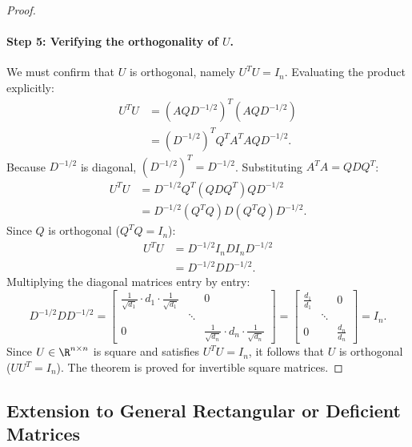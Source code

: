 \begin{proof}
\paragraph{Step 5: Verifying the orthogonality of $U$.}
We must confirm that $U$ is orthogonal, namely $U^T U = I_n$.
Evaluating the product explicitly:
\begin{align}
    U^T U &= \left( A Q D^{-1/2} \right)^T \left( A Q D^{-1/2} \right) \nonumber \\
          &= \left( D^{-1/2} \right)^T Q^T A^T A Q D^{-1/2}.
\end{align}
Because $D^{-1/2}$ is diagonal, $(D^{-1/2})^T = D^{-1/2}$. Substituting $A^T A = Q D Q^T$:
\begin{align}
    U^T U &= D^{-1/2} Q^T (Q D Q^T) Q D^{-1/2} \nonumber \\
          &= D^{-1/2} (Q^T Q) D (Q^T Q) D^{-1/2}.
\end{align}
Since $Q$ is orthogonal ($Q^T Q = I_n$):
\begin{align}
    U^T U &= D^{-1/2} I_n D I_n D^{-1/2} \nonumber \\
          &= D^{-1/2} D D^{-1/2}.
\end{align}
Multiplying the diagonal matrices entry by entry:
\begin{equation}
    D^{-1/2} D D^{-1/2} = \begin{bmatrix}
        \frac{1}{\sqrt{d_1}} \cdot d_1 \cdot \frac{1}{\sqrt{d_1}} & & 0 \\
        & \ddots & \\
        0 & & \frac{1}{\sqrt{d_n}} \cdot d_n \cdot \frac{1}{\sqrt{d_n}}
    \end{bmatrix} = \begin{bmatrix}
        \frac{d_1}{d_1} & & 0 \\
        & \ddots & \\
        0 & & \frac{d_n}{d_n}
    \end{bmatrix} = I_n.
\end{equation}
Since $U \in \R^{n \times n}$ is square and satisfies $U^T U = I_n$, it follows that $U$ is orthogonal ($U U^T = I_n$). The theorem is proved for invertible square matrices.
\end{proof}

\subsection{Extension to General Rectangular or Deficient Matrices}

